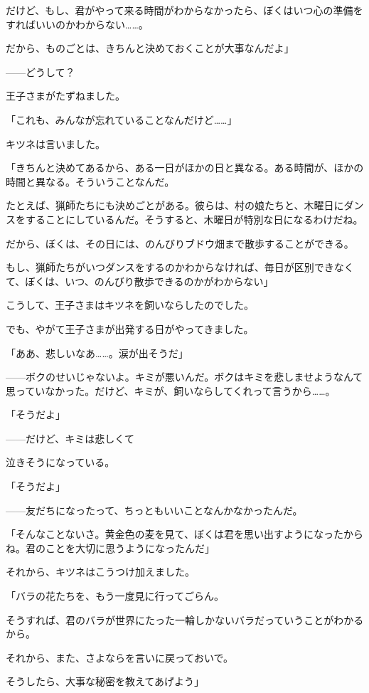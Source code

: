 だけど、もし、君がやって来る時間がわからなかったら、ぼくはいつ心の準備をすればいいのかわからない……。

だから、ものごとは、きちんと決めておくことが大事なんだよ」

——どうして？

王子さまがたずねました。

「これも、みんなが忘れていることなんだけど……」

キツネは言いました。

「きちんと決めてあるから、ある一日がほかの日と異なる。ある時間が、ほかの時間と異なる。そういうことなんだ。

たとえば、猟師たちにも決めごとがある。彼らは、村の娘たちと、木曜日にダンスをすることにしているんだ。そうすると、木曜日が特別な日になるわけだね。

だから、ぼくは、その日には、のんびりブドウ畑まで散歩することができる。

もし、猟師たちがいつダンスをするのかわからなければ、毎日が区別できなくて、ぼくは、いつ、のんびり散歩できるのかがわからない」

こうして、王子さまはキツネを飼いならしたのでした。

でも、やがて王子さまが出発する日がやってきました。

「ああ、悲しいなあ……。涙が出そうだ」


——ボクのせいじゃないよ。キミが悪いんだ。ボクはキミを悲しませようなんて思っていなかった。だけど、キミが、飼いならしてくれって言うから……。


「そうだよ」

——だけど、キミは悲しくて

泣きそうになっている。

「そうだよ」

——友だちになったって、ちっともいいことなんかなかったんだ。

「そんなことないさ。黄金色の麦を見て、ぼくは君を思い出すようになったからね。君のことを大切に思うようになったんだ」

それから、キツネはこうつけ加えました。

「バラの花たちを、もう一度見に行ってごらん。

そうすれば、君のバラが世界にたった一輪しかないバラだっていうことがわかるから。

それから、また、さよならを言いに戻っておいで。

そうしたら、大事な秘密を教えてあげよう」

